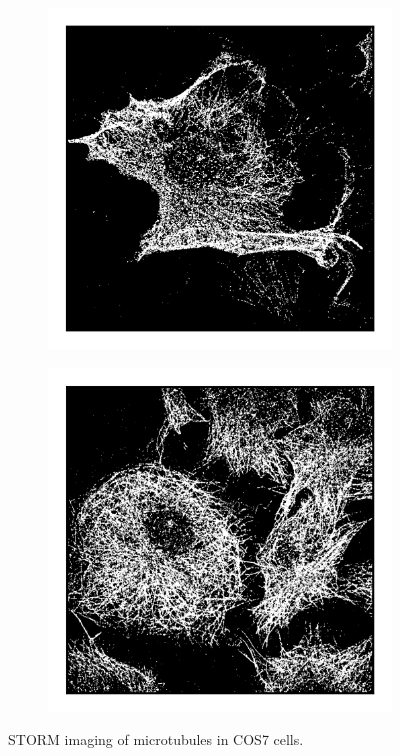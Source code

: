 \begin{figure}
\begin{subfigure}{0.32\textwidth}
        \includegraphics[width=\textwidth]{figures/microtubules_image4.png}
        \caption{}
    \end{subfigure}
    \begin{subfigure}{0.32\textwidth}
        \includegraphics[width=\textwidth]{figures/microtubules_image6.png}
        \caption{}
    \end{subfigure}
    \caption{STORM imaging of microtubules in COS7 cells.}
\end{figure}

